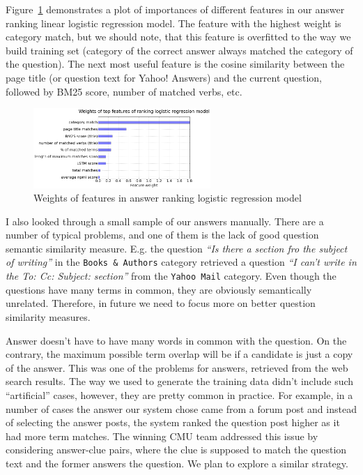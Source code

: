 Figure~\ref{figure:non-factoid:liveqa:features} demonstrates a plot of importances of different features in our answer ranking linear logistic regression model.
The feature with the highest weight is category match, but we should note, that this feature is overfitted to the way we build training set (category of the correct answer always matched the category of the question).
The next most useful feature is the cosine similarity between the page title (or question text for Yahoo! Answers) and the current question, followed by BM25 score, number of matched verbs, etc.

\begin{figure}
	\centering
	\includegraphics[width=0.6\textwidth]{img/liveqa_features}
	\caption{Weights of features in answer ranking logistic regression model}
	\label{figure:non-factoid:liveqa:features}
\end{figure}

I also looked through a small sample of our answers manually.
There are a number of typical problems, and one of them is the lack of good question semantic similarity measure.
E.g. the question \textit{``Is there a section fro the subject of writing''} in the \texttt{Books \& Authors} category retrieved a question \textit{``I can't write in the To: Cc: Subject: section''} from the \texttt{Yahoo Mail} category.
Even though the questions have many terms in common, they are obviously semantically unrelated.
Therefore, in future we need to focus more on better question similarity measures.

Answer doesn't have to have many words in common with the question.
On the contrary, the maximum possible term overlap will be if a candidate is just a copy of the answer.
This was one of the problems for answers, retrieved from the web search results.
The way we used to generate the training data didn't include such ``artificial'' cases, however, they are pretty common in practice.
For example, in a number of cases the answer our system chose came from a forum post and instead of selecting the answer posts, the system ranked the question post higher as it had more term matches.
The winning CMU team addressed this issue by considering answer-clue pairs, where the clue is supposed to match the question text and the former answers the question.
We plan to explore a similar strategy.

